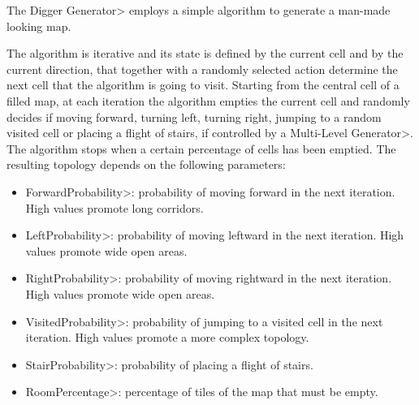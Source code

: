 The \<Digger Generator> employs a simple algorithm to generate a man-made looking map.

\par

The algorithm is iterative and its state is defined by the current cell and by the current direction, that together with a randomly selected action determine the next cell that the algorithm is going to visit. Starting from the central cell of a filled map, at each iteration the algorithm empties the current cell and randomly decides if moving forward, turning left, turning right, jumping to a random visited cell or placing a flight of stairs, if controlled by a \<Multi-Level Generator>. The algorithm stops when a certain percentage of cells has been emptied. The resulting topology depends on the following parameters:

\begin{itemize}
\item \<ForwardProbability>: probability of moving forward in the next iteration. High values promote long corridors. 
\item \<LeftProbability>: probability of moving leftward in the next iteration. High values promote wide open areas. 
\item \<RightProbability>: probability of moving rightward in the next iteration. High values promote wide open areas. 
\item \<VisitedProbability>: probability of jumping to a visited cell in the next iteration. High values promote a more complex topology. 
\item \<StairProbability>: probability of placing a flight of stairs.
\item \<RoomPercentage>: percentage of tiles of the map that must be empty.
\end{itemize}

